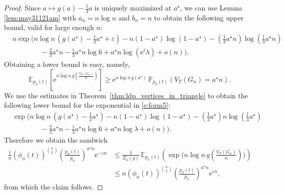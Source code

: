 \documentclass[10pt,a4paper]{amsart}
\newcommand{\e}{{\mathrm e}}
\begin{document}
\begin{proof}
Since $a\mapsto g(a)-\tfrac13 a$ is uniquely maximized at $a^\star$, we can use Lemma \ref{lem:may31121am} with $a_n=n\log{n}$ and $b_n=n$ to obtain the following upper bound, valid for large enough $n$:
	\begin{equation}
	\label{e:form5}
	\begin{aligned}
	&n \exp\Big(n\log{n}\,(g(a^\star)- \tfrac13a^\star +\varepsilon) - n(1-a^\star) \log(1-a^\star) 
	- (\tfrac13 a^\star n) \log(\tfrac13a^\star n)\\
	&\qquad \qquad -\tfrac23 a^\star n -\tfrac13a^\star n\log{6}+a^\star n\log{(\e^t \lambda)} +o(n)\Big).
	\end{aligned}
	\end{equation}
Obtaining a lower bound is easy, namely,
	\begin{equation}
	\mathbb{E}_{p_n(t)}\left[\e^{n\log{n}\,g(\tfrac{V_{ T}(G_n)}{n})}\right]
	\geq  \mathrm{e}^{n\log{n}\, g\left(a^\star\right)}\,\mathbb{P}_{p_n(t)}(V_{T}(G_n)=a^\star n).
	\end{equation}
We use the estimates in Theorem~\ref{thm:ldp_vertices_in_triangle} to obtain the following lower bound for the exponential in \eqref{e:form5}:
	\begin{equation}
	\begin{aligned}
	&\exp\Big(n\log{n}\,(g(a^\star)- \tfrac13a^\star) -n(1-a^\star) \log(1-a^\star) - (\tfrac13a^\star)n\log(\tfrac13a^\star)\\ 
	&\qquad\qquad  - \tfrac23 a^\star n - \tfrac13 a^\star n \log{6} + a^\star n\log{\lambda} +o(n)\Big).
	\end{aligned}
	\end{equation}
Therefore we obtain the sandwich 
	\begin{equation}
	\begin{aligned}
	\frac{1}{n} \left(\phi_n(t)\right)^{{n\choose 2}}\left(\frac{p_n(t)}{p_n}\right)^{a^\star n} \e^{-\varepsilon n}
	&\leq \frac{1}{Z_n(g)}\, \mathbb{E}_{p_n(t)}\left(\exp{\big(n\log{n}\, g(\tfrac{V_{ T}(G_n)}{n})\big)}\right)\\ 
	&\leq n \left(\phi_n(t)\right)^{{n\choose 2}} 
	\left(\frac{p_n(t)}{p_n}\right)^{a^\star n} \e^{\varepsilon n},
	\end{aligned}
	\end{equation}
from which the claim follows.
\end{proof}
\end{document}
